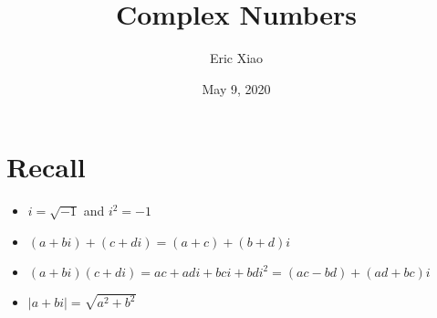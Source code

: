 \documentclass[12pt]{extarticle}
\title{Complex Numbers}
\author{Eric Xiao}
\date{May 9, 2020}
\begin{document}
\maketitle

\section{Recall}
\begin{itemize}
    \item {$i = \sqrt{-1}$ and $i^2 = -1$}
    \item {$(a+bi) + (c+di) = (a+c) + (b+d)i$}
    \item {$(a+bi)(c+di) = ac + adi + bci + bdi^2 = (ac-bd) + (ad+bc)i$}
    \item {$|a+bi| = \sqrt{a^2+b^2}$}
\end{itemize}
\end{document}
